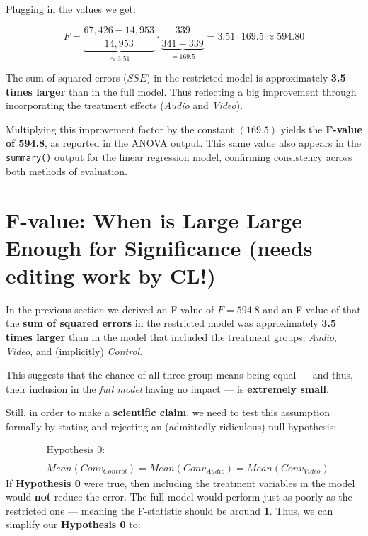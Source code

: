 \documentclass[
  letterpaper,
  DIV=11,
  numbers=noendperiod]{scrartcl}
\begin{document}
Plugging in the values we get:

\[
F =
\underbrace{\frac{67,\!426 - 14,\!953}{14,\!953}}_{
\approx 3.51
}
\cdot
\underbrace{\frac{339}{341-339}}_{= 169.5}
= 3.51 \cdot 169.5
\approx \boxed{594.80}
\]

The sum of squared errors (\(SSE\)) in the restricted model is
approximately \textbf{3.5 times larger} than in the full model. Thus
reflecting a big improvement through incorporating the treatment effects
(\emph{Audio} and \emph{Video}).

Multiplying this improvement factor by the constant \((169.5)\) yields
the \textbf{F-value of 594.8}, as reported in the ANOVA output. This
same value also appears in the \texttt{summary()} output for the linear
regression model, confirming consistency across both methods of
evaluation.

\section{F-value: When is Large Large Enough for Significance (needs
editing work by
CL!)}\label{f-value-when-is-large-large-enough-for-significance-needs-editing-work-by-cl}

In the previous section we derived an F-value of \(F=594.8\) and an
F-value of that the \textbf{sum of squared errors} in the restricted
model was approximately \textbf{3.5 times larger} than in the model that
included the treatment groups: \emph{Audio}, \emph{Video}, and
(implicitly) \emph{Control}.

This suggests that the chance of all three group means being equal ---
and thus, their inclusion in the \emph{full model} having no impact ---
is \textbf{extremely small}.

Still, in order to make a \textbf{scientific claim}, we need to test
this assumption formally by stating and rejecting an (admittedly
ridiculous) null hypothesis:

\[
\begin{align}
& \text{Hypothesis 0:}\\
\\
&Mean(Conv_{Control})=Mean(Conv_{Audio})=Mean(Conv_{Video})
\end{align}
\] If \textbf{Hypothesis 0} were true, then including the treatment
variables in the model would \textbf{not} reduce the error. The full
model would perform just as poorly as the restricted one --- meaning the
F-statistic should be around \textbf{1}. Thus, we can simplify our
\textbf{Hypothesis 0} to:
\end{document}

